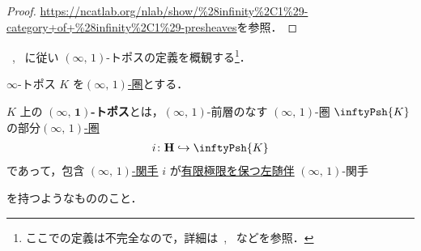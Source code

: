 \documentclass[TQFT_main]{subfiles}
\begin{document}
\begin{proof}
    \url{https://ncatlab.org/nlab/show/%28infinity%2C1%29-category+of+%28infinity%2C1%29-presheaves}を参照．
\end{proof}

~\cite{nLab}, ~\cite[p.9]{NSS2012}に従い $(\infty,\, 1)$-トポスの定義を概観する\footnote{ここでの定義は不完全なので，詳細は~\cite{nLab}, ~\cite{lurie2008higher}などを参照．}．

\begin{mydef}[label=def:infinity-topos]{$\infty$-トポス}
    $K$ を\hyperref[def:infinity-1]{$(\infty,\, 1)$-圏}とする．
    
    $K$ 上の $\bm{(\infty,\, 1)}$\textbf{-トポス}とは，$(\infty,\, 1)$-前層のなす $(\infty,\, 1)$-圏 $\inftyPsh{K}$ の部分\hyperref[def:infinity-1]{$(\infty,\, 1)$-圏}
    \begin{align}
        i \colon \bm{\mathrm{H}} \hookrightarrow \inftyPsh{K}
    \end{align}
    であって，包含 \hyperref[def:infinity-1]{$(\infty,\, 1)$-関手} $i$ が\hyperref[def:colim]{有限極限を保つ}\hyperref[def:adjoint]{左随伴} $(\infty,\, 1)$-関手
    \begin{center}
    \end{center}
    を持つようなもののこと．

    \tcblower


\end{mydef}
\end{document}
